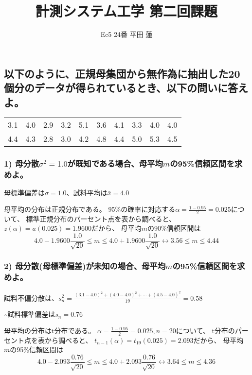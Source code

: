 \documentclass{jsarticle}
\title{計測システム工学 第二回課題}
\author{Ec5 24番 平田 蓮}
\date{}
\begin{document}
\maketitle
\subsection*{以下のように、正規母集団から無作為に抽出した20個分のデータが得られているとき、以下の問いに答えよ。}
    \begin{table}[h]
        \centering
        \begin{tabular}{cccccccccc}
            3.1 & 4.0 & 2.9 & 3.2 & 5.1 & 3.6 & 4.1 & 3.3 & 4.0 & 4.0 \\
            4.4 & 4.3 & 2.8 & 3.0 & 4.2 & 4.8 & 4.4 & 5.0 & 5.3 & 4.5 
        \end{tabular}
    \end{table}

    \subsubsection*{1) 母分散$\sigma ^2=1.0$が既知である場合、母平均$m$の95\%信頼区間を求めよ。}
        母標準偏差は$\sigma = 1.0$、試料平均は$\bar{x} = 4.0$

        母平均の分布は正規分布である。
        95\%の確率に対応する$\displaystyle\alpha = \frac{1 - 0.95}{2} = 0.025$について、
        標準正規分布のパーセント点を表から調べると、
        $z(\alpha) = a(0.025) = 1.9600$だから、
        母平均$m$の90\%信頼区間は
        \begin{equation*}
            4.0 - 1.9600\frac{1.0}{\sqrt{20}} \leq m \leq 4.0 + 1.9600\frac{1.0}{\sqrt{20}}
            \leftrightarrow 3.56 \leq m \leq 4.44
        \end{equation*}

    \subsubsection*{2) 母分散(母標準偏差)が未知の場合、母平均$m$の95\%信頼区間を求めよ。}
        試料不偏分散は、$\displaystyle s_n^2=\frac{(3.1-4.0)^2+(4.0-4.0)^2+\cdots +(4.5-4.0)^2}{19}=0.58$

        $\therefore$試料標準偏差は$s_n=0.76$

        母平均の分布はt分布である。
        $\displaystyle\alpha = \frac{1 - 0.95}{2} = 0.025, n=20$について、
        t分布のパーセント点を表から調べると、
        $t_{n-1}(\alpha)=t_19(0.025)=2.093$だから、
        母平均$m$の95\%信頼区間は
        \begin{equation*}
            4.0 - 2.093\frac{0.76}{\sqrt{20}} \leq m \leq 4.0 + 2.093\frac{0.76}{\sqrt{20}}
            \leftrightarrow 3.64 \leq m \leq 4.36
        \end{equation*}
\end{document}
